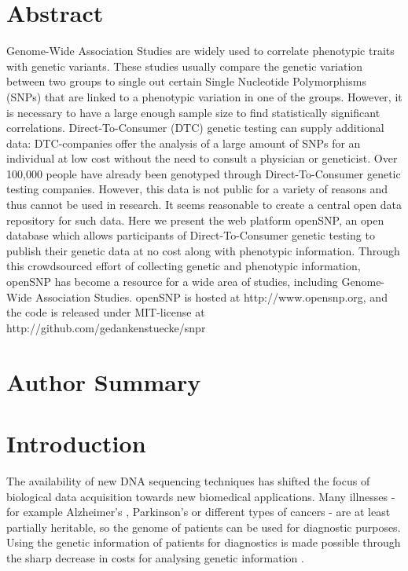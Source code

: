 \documentclass[10pt]{article}
\begin{document}
\section*{Abstract}
Genome-Wide Association Studies are widely used to correlate phenotypic traits with genetic variants. These studies usually compare the genetic variation between two groups to single out certain Single Nucleotide Polymorphisms (SNPs) that are linked to a phenotypic variation in one of the groups. However, it is necessary to have a large enough sample size to find statistically significant correlations. Direct-To-Consumer (DTC) genetic testing can supply additional data: DTC-companies offer the analysis of a large amount of SNPs for an individual at low cost without the need to consult a physician or geneticist. Over 100,000 people have already been genotyped through Direct-To-Consumer genetic testing companies. However, this data is not public for a variety of reasons and thus cannot be used in research. It seems reasonable to create a central open data repository for such data.
Here we present the web platform openSNP, an open database which allows participants of Direct-To-Consumer genetic testing to publish their genetic data at no cost along with phenotypic information. Through this crowdsourced effort of collecting genetic and phenotypic information, openSNP has become a 
resource for a wide area of studies, including Genome-Wide Association Studies. openSNP is hosted at http://www.opensnp.org, and the code is released under MIT-license at http://github.com/gedankenstuecke/snpr


\section*{Author Summary}

\section*{Introduction}

The availability of new DNA sequencing techniques has shifted the focus of biological data acquisition towards new biomedical applications.
Many illnesses - for example Alzheimer's \cite{alzheimer}, Parkinson's \cite{parkinsons} or different types of cancers \cite{breastcancer,prostatecancer} - are at least partially heritable, so the genome of patients can be used for diagnostic purposes. Using the genetic information of patients for diagnostics is made possible through the sharp decrease in costs for analysing genetic information \cite{Brown1999}. 
\end{document}
